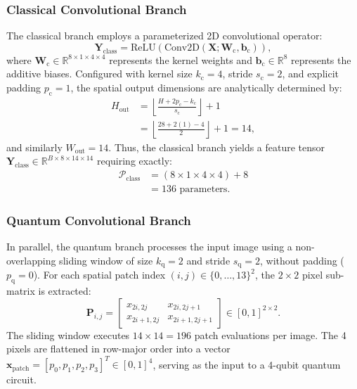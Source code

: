 \documentclass[pdflatex,sn-mathphys-num]{sn-jnl}%
\theoremstyle{thmstyleone}%
\theoremstyle{thmstyletwo}%
\theoremstyle{thmstylethree}%
\begin{document}
\subsubsection{Classical Convolutional Branch}
The classical branch employs a parameterized 2D convolutional operator:
\begin{equation}
\mathbf{Y}_{\mathrm{class}} = \mathrm{ReLU}\left( \mathrm{Conv2D}(\mathbf{X}; \mathbf{W}_{\mathrm{c}}, \mathbf{b}_{\mathrm{c}}) \right),
\label{eq:classical_branch}
\end{equation}
where $\mathbf{W}_{\mathrm{c}} \in \mathbb{R}^{8 \times 1 \times 4 \times 4}$ represents the kernel weights and $\mathbf{b}_{\mathrm{c}} \in \mathbb{R}^8$ represents the additive biases. Configured with kernel size $k_{\mathrm{c}} = 4$, stride $s_{\mathrm{c}} = 2$, and explicit padding $p_{\mathrm{c}} = 1$, the spatial output dimensions are analytically determined by:
\begin{align}
H_{\mathrm{out}} &= \left\lfloor \frac{H + 2p_{\mathrm{c}} - k_{\mathrm{c}}}{s_{\mathrm{c}}} \right\rfloor + 1 \nonumber \\
&= \left\lfloor \frac{28 + 2(1) - 4}{2} \right\rfloor + 1 = 14,
\label{eq:spatial_dim_derivation}
\end{align}
and similarly $W_{\mathrm{out}} = 14$. Thus, the classical branch yields a feature tensor $\mathbf{Y}_{\mathrm{class}} \in \mathbb{R}^{B \times 8 \times 14 \times 14}$ requiring exactly:
\begin{align}
\mathcal{P}_{\mathrm{class}} &= (8 \times 1 \times 4 \times 4) + 8 \nonumber \\
&= 136 \text{ parameters}.
\label{eq:param_classical}
\end{align}

\subsubsection{Quantum Convolutional Branch}
In parallel, the quantum branch processes the input image using a non-overlapping sliding window of size $k_{\mathrm{q}} = 2$ and stride $s_{\mathrm{q}} = 2$, without padding ($p_{\mathrm{q}} = 0$). For each spatial patch index $(i, j) \in \{0, \dots, 13\}^2$, the $2 \times 2$ pixel sub-matrix is extracted:
\begin{equation}
\mathbf{P}_{i,j} = \begin{bmatrix} x_{2i, 2j} & x_{2i, 2j+1} \\ x_{2i+1, 2j} & x_{2i+1, 2j+1} \end{bmatrix} \in [0, 1]^{2 \times 2}.
\label{eq:patch_extraction}
\end{equation}
The sliding window executes $14 \times 14 = 196$ patch evaluations per image. The 4 pixels are flattened in row-major order into a vector $\mathbf{x}_{\mathrm{patch}} = [p_0, p_1, p_2, p_3]^T \in [0, 1]^4$, serving as the input to a 4-qubit quantum circuit.
\end{document}
